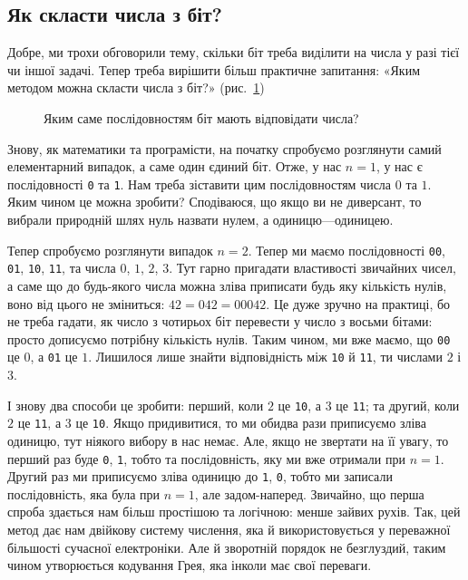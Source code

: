 \documentclass{book}
\newcommand{\bitstr}[1]{{\tt #1}}
\begin{document}
\subsection{Як скласти числа з біт?}

Добре, ми трохи обговорили тему, скільки біт треба виділити на числа у разі тієї чи іншої задачі.
Тепер треба вирішити більш практичне запитання: «Яким методом можна скласти числа з біт?» (рис.~\ref{Pic_Num_From_Bits})

\begin{figure}[t]
  \centering
  
  \caption{Яким саме послідовностям біт мають відповідати числа?}
  \label{Pic_Num_From_Bits}
\end{figure}

Знову, як математики та програмісти, на початку спробуємо розглянути самий елементарний випадок, а саме один єдиний біт.
Отже, у нас $n=1$, у нас є послідовності \bitstr{0} та \bitstr{1}.
Нам треба зіставити цим послідовностям числа $0$ та $1$.
Яким чином це можна зробити?
Сподіваюся, що якщо ви не диверсант, то вибрали природній шлях нуль назвати нулем, а одиницю---одиницею.

Тепер спробуємо розглянути випадок $n=2$.
Тепер ми маємо послідовності \bitstr{00}, \bitstr{01}, \bitstr{10}, \bitstr{11}, та числа $0$, $1$, $2$, $3$.
Тут гарно пригадати властивості звичайних чисел, а саме що до будь-якого числа можна зліва приписати будь яку кількість нулів, воно від цього не зміниться: $42 = 042 = 00042$.
Це дуже зручно на практиці, бо не треба гадати, як число з чотирьох біт перевести у число з восьми бітами: просто дописуємо потрібну кількість нулів.
Таким чином, ми вже маємо, що \bitstr{00} це $0$, а \bitstr{01} це $1$.
Лишилося лише знайти відповідність між \bitstr{10} й \bitstr{11}, ти числами $2$ і $3$.

І знову два способи це зробити: перший, коли $2$ це \bitstr{10}, а $3$ це \bitstr{11}; та другий, коли $2$ це \bitstr{11}, а $3$ це \bitstr{10}.
Якщо придивитися, то ми обидва рази приписуємо зліва одиницю, тут ніякого вибору в нас немає.
Але, якщо не звертати на її увагу, то перший раз буде \bitstr{0}, \bitstr{1}, тобто та послідовність, яку ми вже отримали при $n=1$.
Другий раз ми приписуємо зліва одиницю до \bitstr{1}, \bitstr{0}, тобто ми записали послідовність, яка була при $n=1$, але задом-наперед.
Звичайно, що перша спроба здається нам більш простішою та логічною: менше зайвих рухів.
Так, цей метод дає нам двійкову систему числення, яка й використовується у переважної більшості сучасної електроніки.
Але й зворотній порядок не безглуздий, таким чином утворюється кодування Грея, яка інколи має свої переваги.
\end{document}
